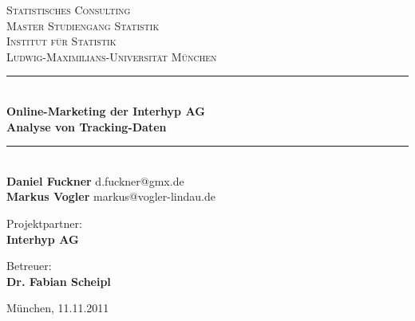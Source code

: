 \begin{titlepage}
	\rmfamily
	\begin{center}
	
		\textsc{\LARGE Statistisches Consulting}\\[1.5cm]

		\textsc{
			\large{	Master Studiengang Statistik\\[0.25cm]
							Institut für Statistik\\[0.25cm]
							Ludwig-Maximilians-Universität München}}\\[0.25cm]
						
		\newcommand{\HRule}{\rule{\linewidth}{0.5mm}}
		\HRule \\[0.4cm]
		{\huge \bfseries Online-Marketing der Interhyp AG\\[0.5cm]Analyse von Tracking-Daten}\\[0.4cm]
		\HRule \\[1.5cm]
		
		\textbf{Daniel Fuckner} d.fuckner@gmx.de\\
		\textbf{Markus Vogler} markus@vogler-lindau.de\\[1.5cm]
	
		\begin{minipage}{0.4\textwidth}
			\begin{flushleft}
				Projektpartner:\\
				\textbf{Interhyp AG}
			\end{flushleft}
		\end{minipage}
		\hfill
		\begin{minipage}{0.4\textwidth}
			\begin{flushright}
				Betreuer:\\
				\textbf{Dr. Fabian Scheipl}
			\end{flushright}
		\end{minipage}
		
		\vfill

		{\large München, 11.11.2011}
		
	\end{center}
\end{titlepage}